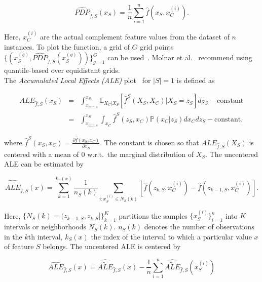 \documentclass[runningheads]{llncs}
\begin{document}
\begin{equation}\label{eq:pdp-estimate}
    \widehat{PDP}_{\hat f, S}(x_S) = \frac{1}{n} \sum_{i=1}^{n} \hat{f}(x_S, x_C^{(i)}).
\end{equation}

\noindent Here, $x_C^{(i)}$ are the actual complement feature values from the dataset of $n$ instances.
To plot the function, a grid of $G$ grid points
$\{(x_S^{(g)}, \widehat{PDP}_{\hat f, S}(x_S^{(g)}))\}_{g=1}^G$ can be used~\cite{molnar_relating_2023}.  %
Molnar et al.~\cite{molnar_general_2022} recommend using quantile-based over equidistant grids.\\

\newpage
\noindent The \textit{Accumulated Local Effects (ALE)} plot~\cite{apley_visualizing_2020}
for $|S|=1$ is defined as

\begin{eqnarray}
    ALE_{\hat f,S}(x_S) &=& \int_{x_{\text{min},s}}^{x_S} \mathbb{E}_{X_C|X_S}
    \left[\hat{f}^S(X_S, X_C)|X_S = z_S\right] dz_S - \text{constant} \\
    &=& \int_{x_{\text{min},s}}^{x_S} \int_{x_C}
    \hat{f}^S(z_S, x_C)\mathbb{P}(x_C|z_S)dx_{C}dz_{S} - \text{constant},
\end{eqnarray}

\noindent where $\hat{f}^S(x_S, x_C) = \frac{\partial \hat{f}(x_S, x_C)}{\partial x_S}$.
The constant is chosen so that $ALE_{\hat f,S}(X_S)$ is centered with a mean of $0$
w.r.t.\ the marginal distribution of $X_S$. The uncentered ALE can be estimated by

\begin{equation}\label{eq:ale-estimate-uncentered}
    \widehat{\widetilde{ALE}}_{\hat f, S}(x) =
    \sum_{k=1}^{k_S(x)} \frac{1}{n_S(k)} \sum_{i:x_S^{(i)} \in N_S(k)}
    \left[\hat f(z_{k,S}, x_{C}^{(i)}) - \hat f(z_{k-1,S}, x_{C}^{(i)})\right].
\end{equation}

\noindent Here, $\{N_S(k) = (z_{k-1,S}, z_{k,S}]\}_{k=1}^{K}$ partitions the samples  %
$\{x^{(i)}_S\}_{i=1}^n$ into $K$ intervals or neighborhoods $N_S(k)$. $n_S(k)$ denotes  %
the number of observations in the $k$th interval, $k_S(x)$ the index
of the interval to which a particular value $x$ of feature $S$ belongs.
The uncentered ALE is centered by

\begin{equation}\label{eq:ale-estimate-centered}
    \widehat{ALE}_{\hat f, S}(x) =
    \widehat{\widetilde{ALE}}_{\hat f, S}(x)
    - \frac{1}{n} \sum_{i=1}^n \widehat{\widetilde{ALE}}_{\hat f, S}(x_S^{(i)})
\end{equation}
\end{document}

